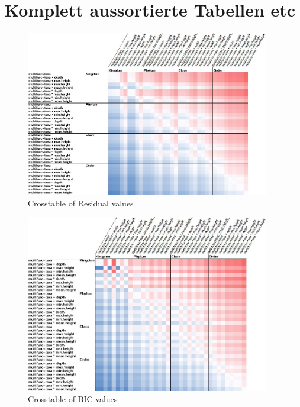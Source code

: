 \chapter{Komplett aussortierte Tabellen etc}

  \begin{figure}
    \centering
    \includegraphics[trim = 0mm 0mm 0mm 0mm, clip,width=0.95\textwidth]{Figures/Kreuztabelle_Residuals.JPG}
    \caption{Crosstable of Residual values}
  \end{figure}

  \begin{figure}
    \centering
    \includegraphics[trim = 0mm 0mm 0mm 0mm, clip,width=0.95\textwidth]{Figures/Kreuztabelle_BIC.JPG}
    \caption{Crosstable of BIC values}
  \end{figure}


